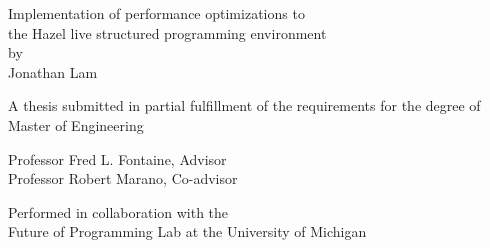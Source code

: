 \thispagestyle{empty}

{
  \centering
  \large

  
  \vfill{}
  
  {
    {
      \huge
      Implementation of performance optimizations to \\
      the Hazel live structured programming environment \\
    }
    \vs{}
    by \\
    Jonathan Lam \\
  }

  \vfill{}

  {
    A thesis submitted in partial fulfillment of the requirements for the degree of \\
    Master of Engineering \\
  }

  \vfill{}

  {
    Professor Fred L. Fontaine, Advisor \\
    Professor Robert Marano, Co-advisor \\
  }


  \vfill{}
  {
    Performed in collaboration with the \\
    Future of Programming Lab at the University of Michigan \\
  }
}

